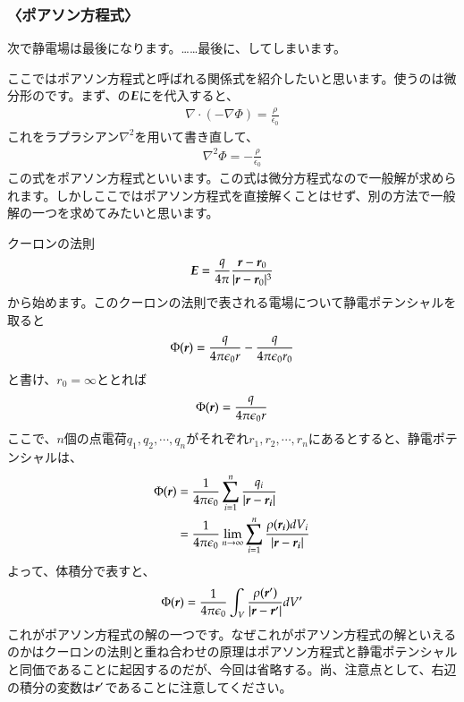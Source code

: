 \documentclass[10pt,b5paper,papersize,dvipdfmx]{jsbook}
\begin{document}
\subsubsection{〈ポアソン方程式〉}
次で静電場は最後になります。……最後に、してしまいます。\par
ここではポアソン方程式と呼ばれる関係式を紹介したいと思います。使うのは微分形のです。まず、の$\vb*{E}$にを代入すると、
\begin{align}
  \nabla\cdot(-\nabla\Phi ) =  \frac{\rho}{\epsilon_0}
\end{align}
これをラプラシアン$\nabla^2$を用いて書き直して、
\begin{align}
  \nabla^2 \Phi = - \frac{\rho}{\epsilon_0}
\end{align}
この式をポアソン方程式といいます。この式は微分方程式なので一般解が求められます。しかしここではポアソン方程式を直接解くことはせず、別の方法で一般解の一つを求めてみたいと思います。\par
クーロンの法則
\begin{align}
  \vb*{E} = \frac{q}{4\pi}\frac{\vb*{r}-\vb*{r}_0}{|\vb*{r}-\vb*{r}_0|^3}
\end{align}
から始めます。このクーロンの法則で表される電場について静電ポテンシャルを取ると
\begin{align}
  \Phi(\vb*{r}) = \frac{q}{4\pi\epsilon_0 r}-\frac{q}{4\pi\epsilon_0 r_0}
\end{align}
と書け、$r_0 = \infty$ととれば
\begin{align}
  \Phi(\vb*{r}) = \frac{q}{4\pi\epsilon_0 r}
\end{align}
ここで、$n$個の点電荷$q_1,q_2,\cdots,q_n$がそれぞれ$r_1,r_2,\cdots,r_n$にあるとすると、静電ポテンシャルは、
\begin{align}
  \Phi(\vb*{r}) 
  &= \frac{1}{4\pi\epsilon_0} \sum_{i=1}^n \frac{q_i}{|\vb*{r}-\vb*{r_i}|} \notag\\
  &= \frac{1}{4\pi\epsilon_0}\lim_{n \to \infty} \sum_{i=1}^n \frac{\rho(\vb*{r_i}) dV_i}{|\vb*{r}-\vb*{r_i}|}
\end{align}
よって、体積分で表すと、
\begin{align}
  \Phi(\vb*{r}) = \frac{1}{4\pi\epsilon_0}\int_V \frac{\rho(\vb*{r}')}{|\vb*{r}-\vb*{r}'|}dV'
\end{align}
これがポアソン方程式の解の一つです。なぜこれがポアソン方程式の解といえるのかはクーロンの法則と重ね合わせの原理はポアソン方程式と静電ポテンシャルと同価であることに起因するのだが、今回は省略する。尚、注意点として、右辺の積分の変数は$\vb*{r}'$であることに注意してください。
\end{document}
